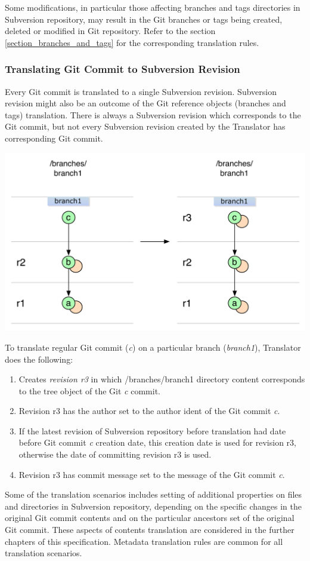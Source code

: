 Some modifications, in particular those affecting branches and tags directories in Subversion repository, may
result in the Git branches or tags being created, deleted or modified in Git repository. Refer to the section \ref{section_branches_and_tags} for the corresponding translation rules. 

\subsubsection{Translating Git Commit to Subversion Revision}
Every Git commit is translated to a single Subversion revision. Subversion revision might also be an outcome of 
the Git reference objects (branches and tags) translation. There is always a Subversion revision
which corresponds to the Git commit, but not every Subversion revision created by the Translator has 
corresponding Git commit.
\begin{center}
\includegraphics[width=\textwidth]{img/diagrams/single_change_git_to_svn.pdf}%
\label{single_change_git_to_svn}%
\end{center}

To translate regular Git commit (\emph{c}) on a particular branch (\emph{branch1}), Translator does 
the following:
\begin{enumerate}
	\compactlist
	\item Creates \emph{revision r3} in which /branches/branch1 directory content corresponds to the tree object of the Git \emph{c} commit. 
	\item Revision r3 has the author set to the author ident of the Git commit \emph{c}.
	\item If the latest revision of Subversion repository before translation had date before Git commit \emph{c} creation date, this creation date is used for revision r3, otherwise the date of committing revision r3 is used.
	\item Revision r3 has commit message set to the message of the Git commit \emph{c}.
\end{enumerate}

Some of the translation scenarios includes setting of additional properties on files and directories 
in Subversion repository, depending on the specific changes in the original Git commit contents and 
on the particular ancestors set of the original Git commit. These aspects of contents translation are considered in the further chapters of
this specification. Metadata translation rules are common for all translation scenarios.